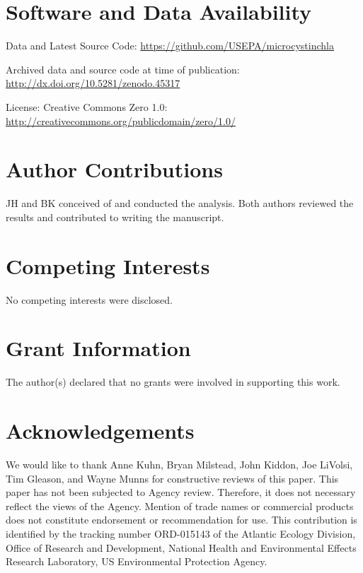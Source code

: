 \documentclass[10pt,a4paper,twocolumn]{article}
\begin{document}
\section{Software and Data
Availability}\label{software-and-data-availability}

Data and Latest Source Code:
\href{https://github.com/USEPA/microcystinchla}{\url{https://github.com/USEPA/microcystinchla}}

Archived data and source code at time of publication:
\href{http://dx.doi.org/10.5281/zenodo.45317}{\url{http://dx.doi.org/10.5281/zenodo.45317}}

License: Creative Commons Zero 1.0:
\href{http://creativecommons.org/publicdomain/zero/1.0/}{\url{http://creativecommons.org/publicdomain/zero/1.0/}}

\section{Author Contributions}\label{author-contributions}

JH and BK conceived of and conducted the analysis. Both authors reviewed
the results and contributed to writing the manuscript.

\section{Competing Interests}\label{competing-interests}

No competing interests were disclosed.

\section{Grant Information}\label{grant-information}

The author(s) declared that no grants were involved in supporting this
work.

\section{Acknowledgements}\label{acknowledgements}

We would like to thank Anne Kuhn, Bryan Milstead, John Kiddon, Joe
LiVolsi, Tim Gleason, and Wayne Munns for constructive reviews of this
paper. This paper has not been subjected to Agency review. Therefore, it
does not necessary reflect the views of the Agency. Mention of trade
names or commercial products does not constitute endorsement or
recommendation for use. This contribution is identified by the tracking
number ORD-015143 of the Atlantic Ecology Division, Office of Research
and Development, National Health and Environmental Effects Research
Laboratory, US Environmental Protection Agency.
\end{document}
